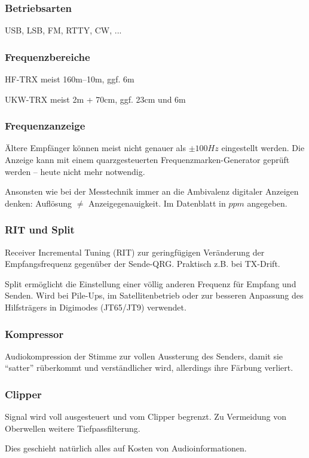 \begin{frame}
  \frametitle{Betriebsarten}

  USB, LSB, FM, RTTY, CW, ...

\end{frame}

\begin{frame}
  \frametitle{Frequenzbereiche}

  HF-TRX meist 160m--10m, ggf. 6m

  \bigskip

  UKW-TRX meist 2m + 70cm, ggf. 23cm und 6m

\end{frame}

\begin{frame}
  \frametitle{Frequenzanzeige}

  Ältere Empfänger können meist nicht genauer als $\pm100Hz$ eingestellt
  werden.  Die Anzeige kann mit einem quarzgesteuerten
  Frequenzmarken-Generator geprüft werden -- heute nicht mehr notwendig.

  \bigskip

  Ansonsten wie bei der Messtechnik immer an die Ambivalenz digitaler Anzeigen
  denken: Auflösung $\neq$ Anzeigegenauigkeit. Im Datenblatt in $ppm$ angegeben.

\end{frame}

\begin{frame}
  \frametitle{RIT und Split}

  Receiver Incremental Tuning (RIT) zur geringfügigen Veränderung der
  Empfangsfrequenz gegenüber der Sende-QRG. Praktisch z.B. bei TX-Drift.

  \bigskip

  Split ermöglicht die Einstellung einer völlig anderen Frequenz für Empfang
  und Senden. Wird bei Pile-Ups, im Satellitenbetrieb oder zur besseren
  Anpassung des Hilfsträgers in Digimodes (JT65/JT9) verwendet.

\end{frame}

\begin{frame}
  \frametitle{Kompressor}

  Audiokompression der Stimme zur vollen Aussterung des Senders, damit sie
  ``satter'' rüberkommt und verständlicher wird, allerdings ihre Färbung
  verliert.

\end{frame}

\begin{frame}
  \frametitle{Clipper}

  Signal wird voll ausgesteuert und vom Clipper begrenzt. Zu Vermeidung von
  Oberwellen weitere Tiefpassfilterung.

  \bigskip

  Dies geschieht natürlich alles auf Kosten von Audioinformationen.

\end{frame}


